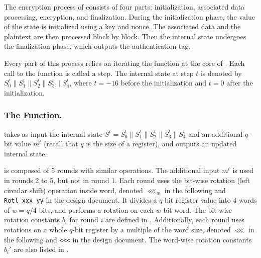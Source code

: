 The encryption process of \MORUS consists of four parts: initialization, associated data processing, encryption, and finalization. 
During the initialization phase, the value of the state is initialized using a key and nonce.
The associated data and the plaintext are then processed block by block.
Then the internal state undergoes the finalization phase, which outputs the authentication tag.

Every part of this process relies on iterating the \StateUpdate{} function at the core of \MORUS. Each call to the \StateUpdate{} function is called a step.
The internal state at step $t$ is denoted by $S^t_0\|S^t_1\|S^t_2\|S^t_3\|S^t_4$, where $t = -16$ before the initialization and $t=0$ after the initialization.


\subsubsection{The \StateUpdate{} Function.}
\StateUpdate{} takes as input the internal state $S^t = S^t_0\|S^t_1\|S^t_2\|S^t_3\|S^t_4$ and an additional $q$-bit value $m^t$ (recall that $q$ is the size of a register), and outputs an updated internal state.

\StateUpdate{} is composed of 5 rounds with similar operations.
The additional input $m^t$ is used in rounds 2 to 5, but not in round 1.
Each round uses the bit-wise rotation (left circular shift) operation inside word,
denoted $\lll_w$ in the following and \texttt{Rotl\_xxx\_yy} in the design document.
It divides a $q$-bit register value into 4 words of $w = q/4$ bits, and performs a rotation on each $w$-bit word.
The bit-wise rotation constants $b_i$ for round $i$ are defined in .
Additionally, each round uses rotations on a whole $q$-bit register by a multiple of the word size,
denoted $\lll$ in the following and \texttt{<<<} in the design document.
The word-wise rotation constants $b_i'$ are also listed in .

